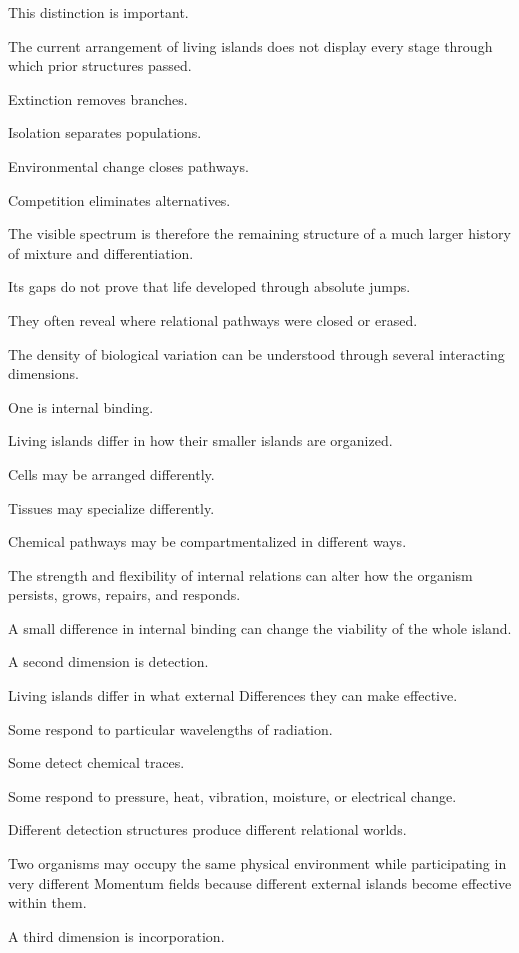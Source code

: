 This distinction is important.

The current arrangement of living islands does not display every stage through which prior structures passed.

Extinction removes branches.

Isolation separates populations.

Environmental change closes pathways.

Competition eliminates alternatives.

The visible spectrum is therefore the remaining structure of a much larger history of mixture and differentiation.

Its gaps do not prove that life developed through absolute jumps.

They often reveal where relational pathways were closed or erased.

The density of biological variation can be understood through several interacting dimensions.

One is internal binding.

Living islands differ in how their smaller islands are organized.

Cells may be arranged differently.

Tissues may specialize differently.

Chemical pathways may be compartmentalized in different ways.

The strength and flexibility of internal relations can alter how the organism persists, grows, repairs, and responds.

A small difference in internal binding can change the viability of the whole island.

A second dimension is detection.

Living islands differ in what external Differences they can make effective.

Some respond to particular wavelengths of radiation.

Some detect chemical traces.

Some respond to pressure, heat, vibration, moisture, or electrical change.

Different detection structures produce different relational worlds.

Two organisms may occupy the same physical environment while participating in very different Momentum fields because different external islands become effective within them.

A third dimension is incorporation.

